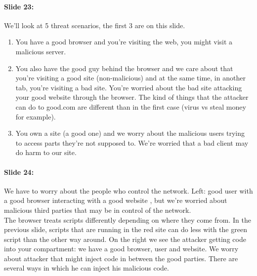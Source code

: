 \documentclass[10pt,a4paper]{report}
\begin{document}
\paragraph{Slide 23:} We'll look at 5 threat scenarios, the first 3 are on this slide. 
\begin{enumerate}
\item You have a good browser and you're visiting the web, you might visit a malicious server.
\item You also have the good guy behind the browser and we care about that you're visiting a good site (non-malicious) and at the same time, in another tab, you're visiting a bad site. You're worried about the bad site attacking your good website through the browser. The kind of things that the attacker can do to good.com are different than in the first case (virus vs steal money for example). 
\item You own a site (a good one) and we worry about the malicious users trying to access parts they're not supposed to. We're worried that a bad client may do harm to our site.
\end{enumerate}

\paragraph{Slide 24:} We have to worry about the people who control the network. Left: good user with a good browser interacting with a good website , but we're worried about malicious third parties that may be in control of the network. \\
The browser treats scripts differently depending on where they come from. In the previous slide, scripts that are running in the red site can do less with the green script than the other way around.
On the right we see the attacker getting code into your compartment: we have a good browser, user and website. We worry about attacker that might inject code in between the good parties. There are several ways in which he can inject his malicious code. 
\end{document}
